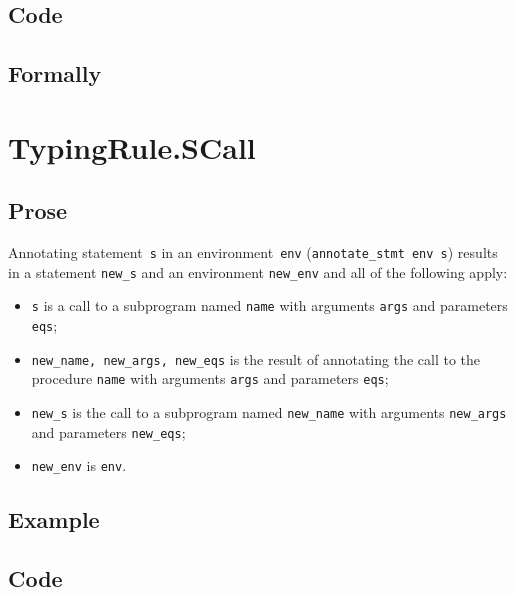 \documentclass{book}
\begin{document}
  \subsection{Code}

\begin{emptyformal}
    \subsection{Formally}
\end{emptyformal}


\section{TypingRule.SCall \label{sec:TypingRule.SCall}}

    \subsection{Prose}
Annotating statement~\texttt{s} in an environment~\texttt{env}
(\texttt{annotate\_stmt env s}) results in a statement \texttt{new\_s} and an
environment \texttt{new\_env} and all of the following apply:
   \begin{itemize}
   \item \texttt{s} is a call to a subprogram named \texttt{name} with arguments \texttt{args} and parameters \texttt{eqs};
   \item \texttt{new\_name, new\_args, new\_eqs} is the result of annotating the call
      to the procedure \texttt{name} with arguments \texttt{args} and parameters
\texttt{eqs};
   \item \texttt{new\_s} is the call to a subprogram named \texttt{new\_name} with arguments
      \texttt{new\_args} and parameters \texttt{new\_eqs};
   \item \texttt{new\_env} is \texttt{env}.
   \end{itemize}

  \subsection{Example}

  \subsection{Code}
\end{document}
